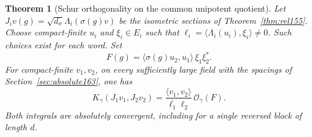 \documentclass[a4paper,11pt]{article}
\newtheorem{theorem}[proposition]{Theorem}
\theoremstyle{definition}
\theoremstyle{remark}
\numberwithin{equation}{section}
\begin{document}
\begin{theorem}[Schur orthogonality on the common unipotent quotient]
\label{thm:quot207}
Let \(J_i v(g)=\sqrt{d_\sigma}\Lambda_i(\sigma(g)v)\) be the
isometric sections of Theorem~\ref{thm:rel155}. Choose compact-finite
\(u_i\) and \(\xi_i\in E_i\) such that
\(\ell_i=\langle\Lambda_i(u_i),\xi_i\rangle\ne0\).
Such choices exist for each word. Set
\[
          F(g)=\langle\sigma(g)u_2,u_1\rangle\,\xi_1\xi_2^* .
\]
For compact-finite \(v_1,v_2\), on every sufficiently large field
with the spacings of Section~\ref{sec:absolute163}, one has
\begin{equation}
 K_\gamma(J_1 v_1,J_2 v_2)
     =\frac{\langle v_1,v_2\rangle}
                 {\overline{\ell_1}\ell_2}\,\mathcal O_\gamma(F).
                                                        \label{eq:quot207}
\end{equation}
Both integrals are absolutely convergent, including for a single
reversed block of length \(d\).
\end{theorem}
\end{document}
